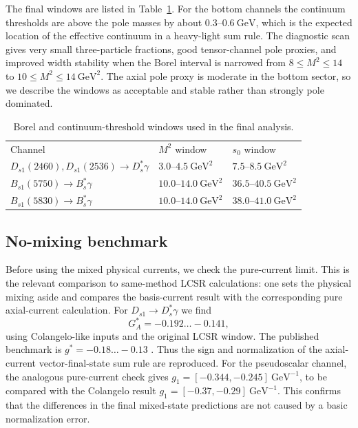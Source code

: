 \documentclass[aps,prd,a4paper,preprint,preprintnumbers,titlepage,
nofootinbib,superscriptaddress]{revtex4-2}
\newcommand{\Dst}{D_s^\ast}
\newcommand{\Dsone}{D_{s1}}
\newcommand{\Bst}{B_s^\ast}
\newcommand{\Bsone}{B_{s1}}
\newcommand{\GeV}{\mathrm{GeV}}
\begin{document}
The final windows are listed in Table~\ref{tab:windows}.  For the bottom
channels the continuum thresholds are above the pole masses by about
\(0.3\)--\(0.6~\GeV\), which is the expected location of the effective
continuum in a heavy-light sum rule.  The diagnostic scan gives very small
three-particle fractions, good tensor-channel pole proxies, and improved
width stability when the Borel interval is narrowed from \(8\le M^2\le14\)
to \(10\le M^2\le14~\GeV^2\).  The axial pole proxy is moderate in the
bottom sector, so we describe the windows as acceptable and stable rather
than strongly pole dominated.

\begin{table}[t]
\centering
\caption{Borel and continuum-threshold windows used in the final analysis.}
\label{tab:windows}
\begin{ruledtabular}
\begin{tabular}{lll}
Channel & \(M^2\) window & \(s_0\) window\\
\colrule
\(\Dsone(2460),\Dsone(2536)\to\Dst\gamma\) &
\(3.0\)--\(4.5~\GeV^2\) & \(7.5\)--\(8.5~\GeV^2\)\\
\(B_{s1}(5750)\to\Bst\gamma\) &
\(10.0\)--\(14.0~\GeV^2\) & \(36.5\)--\(40.5~\GeV^2\)\\
\(\Bsone(5830)\to\Bst\gamma\) &
\(10.0\)--\(14.0~\GeV^2\) & \(38.0\)--\(41.0~\GeV^2\)\\
\end{tabular}
\end{ruledtabular}
\end{table}

\subsection{No-mixing benchmark}
\label{subsec:no-mixing}

Before using the mixed physical currents, we check the pure-current limit.
This is the relevant comparison to same-method LCSR calculations: one sets
the physical mixing aside and compares the basis-current result with the
corresponding pure axial-current calculation.  For
\(\Dsone\to\Dst\gamma\) we find
\[
  G_A^\ast=-0.192\ldots -0.141 ,
\]
using Colangelo-like inputs and the original LCSR window.  The published
benchmark is \(g^\ast=-0.18\ldots -0.13\) \cite{Colangelo:2005hv}.  Thus the
sign and normalization of the axial-current vector-final-state sum rule are
reproduced.  For the pseudoscalar channel, the analogous pure-current check
gives \(g_1=[-0.344,-0.245]~\GeV^{-1}\), to be compared with the
Colangelo result \(g_1=[-0.37,-0.29]~\GeV^{-1}\).  This confirms that the
differences in the final mixed-state predictions are not caused by a basic
normalization error.
\end{document}
